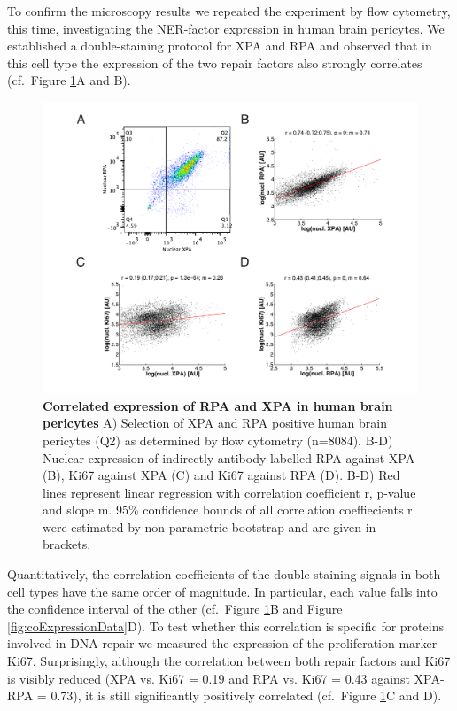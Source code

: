 To confirm the microscopy results we repeated the experiment by flow cytometry, this time, investigating the NER-factor expression in human brain pericytes. We established a double-staining protocol for XPA and RPA and observed that in this cell type the expression of the two repair factors also strongly correlates (cf.\ Figure \ref{fig:FC_correlation}A and B).    
\begin{figure}[htbp]
	\begin{center}
		\includegraphics[width=1\textwidth]{Abbildungen/figureTAC_3.pdf}
		\caption{\textbf{Correlated expression of RPA and XPA in human brain pericytes} A) Selection of XPA and RPA positive human brain pericytes (Q2) as determined by flow cytometry (n=8084). B-D) Nuclear expression of indirectly antibody-labelled RPA against XPA (B), Ki67 against XPA (C) and Ki67 against RPA (D). B-D) Red lines represent linear regression with correlation coefficient r, p-value and slope m. 95\% confidence bounds of all correlation coeffiecients r were estimated by non-parametric bootstrap and are given in brackets.}
		\label{fig:FC_correlation}
	\end{center}
\end{figure}
Quantitatively, the correlation coefficients of the double-staining signals in both cell types have the same order of magnitude. In particular, each value falls into the confidence interval of the other (cf.\ Figure \ref{fig:FC_correlation}B and Figure \ref{fig:coExpressionData}D). To test whether this correlation is specific for proteins involved in DNA repair we measured the expression of the proliferation marker Ki67. Surprisingly, although the correlation between both repair factors and Ki67 is visibly reduced (XPA vs. Ki67 = 0.19 and RPA vs. Ki67 = 0.43 against XPA-RPA = 0.73), it is still significantly positively correlated (cf.\ Figure \ref{fig:FC_correlation}C and D).\\
